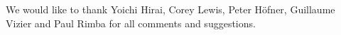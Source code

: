 \documentclass[sigplan,10pt]{acmart}\settopmatter{printfolios=true,printccs=false,printacmref=false}
\begin{document}
\begin{acks}                            %


We would like to thank Yoichi Hirai, Corey Lewis, Peter H\"ofner, Guillaume Vizier
and Paul Rimba for all comments and suggestions.
\end{acks}





\end{document}
